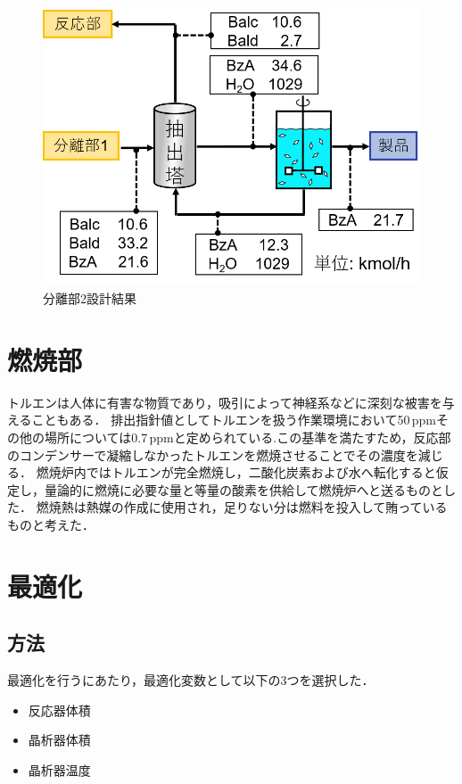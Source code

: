 \documentclass[a4j]{jsreport}
\begin{document}
\begin{figure}[htbp]
  \centering
  \includegraphics[scale=0.7]{Separion2Conclusion.png}
  \caption{分離部2設計結果}
  \label{分離部2設計結果}
\end{figure}


\clearpage
\chapter{燃焼部}
トルエンは人体に有害な物質であり，吸引によって神経系などに深刻な被害を与えることもある．
排出指針値としてトルエンを扱う作業環境において50\,ppmその他の場所については0.7\,ppmと定められている\cite{トルエン排出基準}.この基準を満たすため，反応部のコンデンサーで凝縮しなかったトルエンを燃焼させることでその濃度を減じる．
燃焼炉内ではトルエンが完全燃焼し，二酸化炭素および水へ転化すると仮定し，量論的に燃焼に必要な量と等量の酸素を供給して燃焼炉へと送るものとした．
燃焼熱は熱媒の作成に使用され，足りない分は燃料を投入して賄っているものと考えた．

\clearpage
\chapter{最適化}
\section{方法}
最適化を行うにあたり，最適化変数として以下の3つを選択した．
\begin{itemize}
  \item 反応器体積
  \item 晶析器体積
  \item 晶析器温度
\end{itemize}
\end{document}

